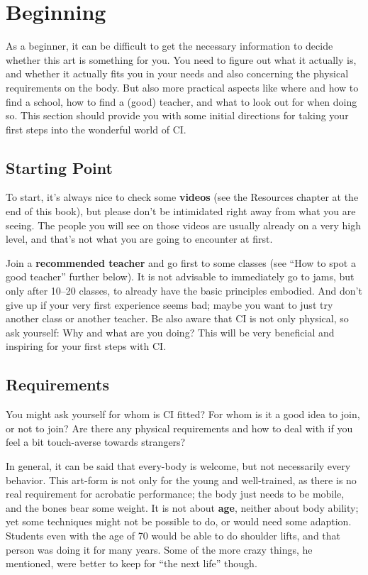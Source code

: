 \chapter{Beginning}\label{ch:beginning}


As a beginner, it can be difficult to get the necessary information to decide whether this art is something for you.
You need to figure out what it actually is, and whether it actually fits you in your needs and also concerning the physical requirements on the body.
But also more practical aspects like where and how to find a school, how to find a (good) teacher, and what to look out for when doing so.
This section should provide you with some initial directions for taking your first steps into the wonderful world of CI\@.

\section{Starting Point}\label{sec:starting-point}

To start, it's always nice to check some \textbf{videos} (see the Resources chapter at the end of this book), but please don't be intimidated right away from what you are seeing.
The people you will see on those videos are usually already on a very high level, and that's not what you are going to encounter at first.

Join a \textbf{recommended teacher} and go first to some classes (see ``How to spot a good teacher'' further below).
It is not advisable to immediately go to jams, but only after 10--20 classes, to already have the basic principles embodied.
And don't give up if your very first experience seems bad; maybe you want to just try another class or another teacher.
Be also aware that CI is not only physical, so ask yourself: Why and what are you doing?
This will be very beneficial and inspiring for your first steps with CI\@.

\section{Requirements}\label{sec:requirements}

You might ask yourself for whom is CI fitted?
For whom is it a good idea to join, or not to join?
Are there any physical requirements and how to deal with if you feel a bit touch-averse towards strangers?

In general, it can be said that every-body is welcome, but not necessarily every behavior.
This art-form is not only for the young and well-trained, as there is no real requirement for acrobatic performance; the body just needs to be mobile, and the bones bear some weight.
It is not about \textbf{age}, neither about body ability; yet some techniques might not be possible to do, or would need some adaption.
Students even with the age of 70 would be able to do shoulder lifts, and that person was doing it for many years.
Some of the more crazy things, he mentioned, were better to keep for ``the next life'' though.

